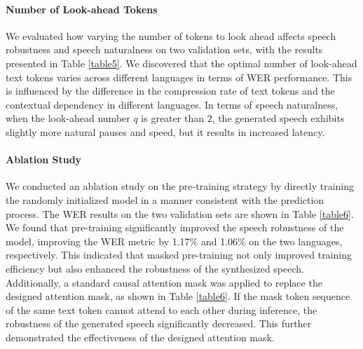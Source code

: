 \paragraph{Number of Look-ahead Tokens}
We evaluated how varying the number of tokens to look ahead affects speech robustness and speech naturalness on two validation sets, with the results presented in Table \ref{table5}. We discovered that the optimal number of look-ahead text tokens varies across different languages in terms of WER performance.  This is influenced by the difference in the compression rate of text tokens and the contextual dependency in different languages. In terms of speech naturalness, when the look-ahead number $q$ is greater than $2$, the generated speech exhibits slightly more natural pauses and speed, but it results in increased latency.

\paragraph{Ablation Study}
We conducted an ablation study on the pre-training strategy by directly training the randomly initialized model in a manner consistent with the prediction process. The WER results on the two validation sets are shown in Table \ref{table6}. We found that pre-training significantly improved the speech robustness of the model, improving the WER metric by 1.17\% and 1.06\% on the two languages, respectively. This indicated that masked pre-training not only improved training efficiency but also enhanced the robustness of the synthesized speech. Additionally, a standard causal attention mask was applied to replace the designed attention mask, as shown in Table \ref{table6}. If the mask token sequence of the same text token cannot attend to each other during inference, the robustness of the generated speech significantly decreased. This further demonstrated the effectiveness of the designed attention mask.



